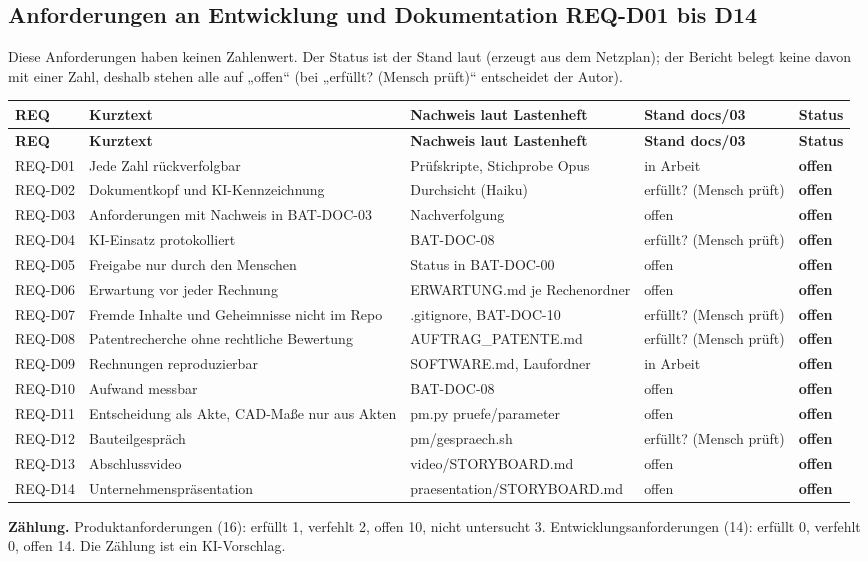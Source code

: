 \documentclass[10pt,a4paper]{article}
\begin{document}
\subsection*{Anforderungen an Entwicklung und Dokumentation REQ-D01 bis D14}
Diese Anforderungen haben keinen Zahlenwert. Der Status ist der Stand laut  (erzeugt aus dem Netzplan); der Bericht belegt keine davon mit einer Zahl, deshalb stehen alle auf „offen“ (bei „erfüllt? (Mensch prüft)“ entscheidet der Autor).
{\footnotesize\setlength{\tabcolsep}{3pt}\begin{longtable}{@{}p{1.45cm}>{\raggedright\arraybackslash}p{5.0cm}>{\raggedright\arraybackslash}p{4.5cm}>{\raggedright\arraybackslash}p{3.0cm}p{1.1cm}@{}}
\toprule \textbf{REQ} & \textbf{Kurztext} & \textbf{Nachweis laut Lastenheft} & \textbf{Stand docs/03} & \textbf{Status}\\\midrule\endfirsthead
\toprule \textbf{REQ} & \textbf{Kurztext} & \textbf{Nachweis laut Lastenheft} & \textbf{Stand docs/03} & \textbf{Status}\\\midrule\endhead\bottomrule\endlastfoot
REQ-D01 & Jede Zahl rückverfolgbar & Prüfskripte, Stichprobe Opus & in Arbeit & \textbf{offen}\\
REQ-D02 & Dokumentkopf und KI-Kennzeichnung & Durchsicht (Haiku) & erfüllt? (Mensch prüft) & \textbf{offen}\\
REQ-D03 & Anforderungen mit Nachweis in BAT-DOC-03 & Nachverfolgung & offen & \textbf{offen}\\
REQ-D04 & KI-Einsatz protokolliert & BAT-DOC-08 & erfüllt? (Mensch prüft) & \textbf{offen}\\
REQ-D05 & Freigabe nur durch den Menschen & Status in BAT-DOC-00 & offen & \textbf{offen}\\
REQ-D06 & Erwartung vor jeder Rechnung & ERWARTUNG.md je Rechenordner & offen & \textbf{offen}\\
REQ-D07 & Fremde Inhalte und Geheimnisse nicht im Repo & .gitignore, BAT-DOC-10 & erfüllt? (Mensch prüft) & \textbf{offen}\\
REQ-D08 & Patentrecherche ohne rechtliche Bewertung & AUFTRAG\_PATENTE.md & erfüllt? (Mensch prüft) & \textbf{offen}\\
REQ-D09 & Rechnungen reproduzierbar & SOFTWARE.md, Laufordner & in Arbeit & \textbf{offen}\\
REQ-D10 & Aufwand messbar & BAT-DOC-08 & offen & \textbf{offen}\\
REQ-D11 & Entscheidung als Akte, CAD-Maße nur aus Akten & pm.py pruefe/parameter & offen & \textbf{offen}\\
REQ-D12 & Bauteilgespräch & pm/gespraech.sh & erfüllt? (Mensch prüft) & \textbf{offen}\\
REQ-D13 & Abschlussvideo & video/STORYBOARD.md & offen & \textbf{offen}\\
REQ-D14 & Unternehmenspräsentation & praesentation/STORYBOARD.md & offen & \textbf{offen}\\
\end{longtable}}
\textbf{Zählung.} Produktanforderungen (16): erfüllt 1, verfehlt 2, offen 10, nicht untersucht 3. Entwicklungsanforderungen (14): erfüllt 0, verfehlt 0, offen 14. Die Zählung ist ein KI-Vorschlag.
\end{document}
